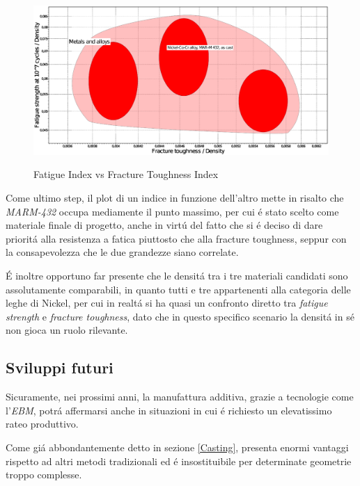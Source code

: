 \documentclass{article}
\begin{document}
        \begin{figure}[h!]
             \label{fig:indici_di_merito}
            \includegraphics[width=\textwidth]{indici.eps}
            \caption{Fatigue Index vs Fracture Toughness Index}
        \end{figure}

        Come ultimo step, il plot di un indice in funzione dell'altro mette in risalto che \textit{MARM-432}
        occupa mediamente il punto massimo, per cui é stato scelto come materiale finale di progetto, 
        anche in virtú del fatto che si é deciso di dare prioritá alla resistenza a fatica piuttosto che 
        alla fracture toughness, seppur con la consapevolezza che le due grandezze siano correlate.

        É inoltre opportuno far presente che le densitá tra i tre materiali candidati sono assolutamente comparabili, 
        in quanto tutti e tre appartenenti alla categoria delle leghe di Nickel, per cui in realtá si ha 
        quasi un confronto diretto tra \textit{fatigue strength} e \textit{fracture toughness}, dato che in questo specifico 
        scenario la densitá in sé non gioca un ruolo rilevante.

        \clearpage

    \subsection{Sviluppi futuri}

    Sicuramente, nei prossimi anni, la manufattura additiva, grazie a tecnologie come l'\textit{EBM}, 
    potrá affermarsi anche in situazioni in cui é richiesto un elevatissimo rateo produttivo. 

    Come giá abbondantemente detto in sezione \ref{Casting}, presenta enormi vantaggi rispetto ad altri 
    metodi tradizionali ed é insostituibile per determinate geometrie troppo complesse. \\
    
\end{document}
